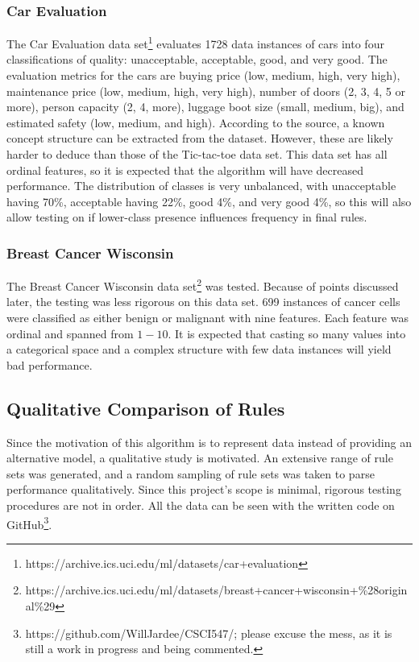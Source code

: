 \documentclass[11pt]{article}
\begin{document}
\subsubsection{Car Evaluation}
The Car Evaluation data set\footnote{https://archive.ics.uci.edu/ml/datasets/car+evaluation} evaluates 1728 data instances of cars into four classifications of quality: unacceptable, acceptable, good, and very good. The evaluation metrics for the cars are buying price (low, medium, high, very high), maintenance price (low, medium, high, very high), number of doors (2, 3, 4, 5 or more), person capacity (2, 4, more), luggage boot size (small, medium, big), and estimated safety (low, medium, and high). According to the source, a known concept structure can be extracted from the dataset. However, these are likely harder to deduce than those of the Tic-tac-toe data set. This data set has all ordinal features, so it is expected that the algorithm will have decreased performance. The distribution of classes is very unbalanced, with unacceptable having 70\%, acceptable having 22\%, good 4\%, and very good 4\%, so this will also allow testing on if lower-class presence influences frequency in final rules. 

\subsubsection{Breast Cancer Wisconsin}
The Breast Cancer Wisconsin data set\footnote{https://archive.ics.uci.edu/ml/datasets/breast+cancer+wisconsin+\%28original\%29} was tested. Because of points discussed later, the testing was less rigorous on this data set. 699 instances of cancer cells were classified as either benign or malignant with nine features. Each feature was ordinal and spanned from $1-10$. It is expected that casting so many values into a categorical space and a complex structure with few data instances will yield bad performance.

\subsection{Qualitative Comparison of Rules}
Since the motivation of this algorithm is to represent data instead of providing an alternative model, a qualitative study is motivated. An extensive range of rule sets was generated, and a random sampling of rule sets was taken to parse performance qualitatively. Since this project's scope is minimal, rigorous testing procedures are not in order. All the data can be seen with the written code on GitHub\footnote{https://github.com/WillJardee/CSCI547/; please excuse the mess, as it is still a work in progress and being commented.}. 
\end{document}
